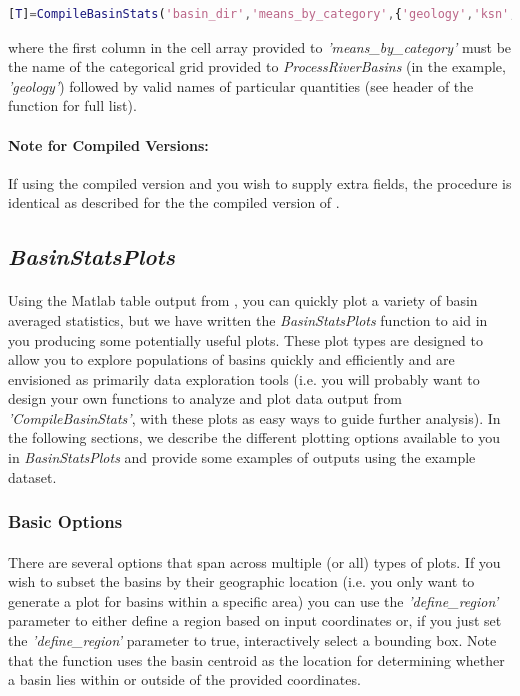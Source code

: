 \begin{lstlisting}[language=Matlab]
% To calculate means using the geology additional grid for ksn and 2500 m local relief
[T]=CompileBasinStats('basin_dir','means_by_category',{'geology','ksn','rlf2500'});
\end{lstlisting}

\noindent
where the first column in the cell array provided to \textit{'means\_by\_category'} must be the name of the categorical grid provided to \textit{ProcessRiverBasins} (in the example, \textit{'geology'}) followed by valid names of particular quantities (see header of the function for full list).

\paragraph{Note for Compiled Versions:} If using the compiled version  and you wish to supply extra fields, the procedure is identical as described for the the compiled version of .

\subsection{\textit{BasinStatsPlots}} \label{sec:BSPlots}
\paragraph{}Using the Matlab table output from , you can quickly plot a variety of basin averaged statistics, but we have written the \textit{BasinStatsPlots} function to aid in you producing some potentially useful plots. These plot types are designed to allow you to explore populations of basins quickly and efficiently and are envisioned as primarily data exploration tools (i.e. you will probably want to design your own functions to analyze and plot data output from \textit{'CompileBasinStats'}, with these plots as easy ways to guide further analysis). In the following sections, we describe the different plotting options available to you in \textit{BasinStatsPlots} and provide some examples of outputs using the example dataset.

\subsubsection{Basic Options}
\paragraph{}There are several options that span across multiple (or all) types of plots. If you wish to subset the basins by their geographic location (i.e. you only want to generate a plot for basins within a specific area) you can use the \textit{'define\_region'} parameter to either define a region based on input coordinates or, if you just set the \textit{'define\_region'} parameter to true, interactively select a bounding box. Note that the function uses the basin centroid as the location for determining whether a basin lies within or outside of the provided coordinates.

